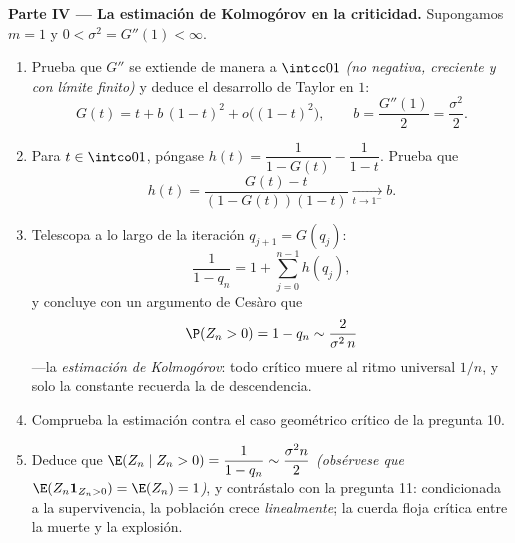\begin{problem}
\medskip
\noindent\textbf{Parte IV --- La estimación de Kolmogórov en la
criticidad.} Supongamos $m = 1$ y $0 < \sigma^2 = G''(1) < \infty$.
\begin{enumerate}[resume]
  \item Prueba que $G''$ se extiende de manera  a $\intcc01$
        \emph{(no negativa, creciente y con límite finito)} y deduce
        el desarrollo de Taylor en $1$:
        \[
        G(t) = t + b\,(1-t)^2 + o\bigl((1-t)^2\bigr),
        \qquad b = \frac{G''(1)}2 = \frac{\sigma^2}2 .
        \]
  \item Para $t \in \intco01$, póngase $h(t) = \dfrac1{1 - G(t)} -
        \dfrac1{1 - t}$. Prueba que
        \[
        h(t) = \frac{G(t) - t}{(1 - G(t))(1 - t)}
        \xrightarrow[t\to1^-]{} b .
        \]
  \item Telescopa a lo largo de la iteración $q_{j+1} = G(q_j)$:
        \[
        \frac1{1 - q_n} = 1 + \sum_{j=0}^{n-1}h(q_j),
        \]
        y concluye con un argumento de Cesàro que
        \[
        \P(Z_n > 0) = 1 - q_n \sim \frac{2}{\sigma^2\,n}
        \]
        ---la \emph{estimación de Kolmogórov}: todo
         crítico muere al ritmo universal $1/n$,
        y solo la constante recuerda la  de descendencia.
  \item Comprueba la estimación contra el caso geométrico crítico de
        la pregunta 10.
  \item Deduce que $\E(Z_n \mid Z_n > 0) = \dfrac{1}{1 - q_n} \sim
        \dfrac{\sigma^2 n}{2}$ \emph{(obsérvese que $\E(Z_n \mathbf
        1_{Z_n>0}) = \E(Z_n) = 1$)}, y contrástalo con la pregunta
        11: condicionada a la supervivencia, la población crece
        \emph{linealmente}; la cuerda floja crítica entre la muerte y
        la explosión.
\end{enumerate}


\end{problem}
